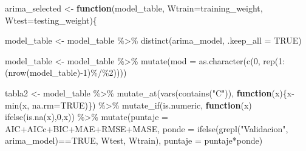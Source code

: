 \documentclass[
]{article}
\newenvironment{Shaded}{\begin{snugshade}}{\end{snugshade}}
\newcommand{\AttributeTok}[1]{\textcolor[rgb]{0.77,0.63,0.00}{#1}}
\newcommand{\ConstantTok}[1]{\textcolor[rgb]{0.00,0.00,0.00}{#1}}
\newcommand{\ControlFlowTok}[1]{\textcolor[rgb]{0.13,0.29,0.53}{\textbf{#1}}}
\newcommand{\DecValTok}[1]{\textcolor[rgb]{0.00,0.00,0.81}{#1}}
\newcommand{\FunctionTok}[1]{\textcolor[rgb]{0.00,0.00,0.00}{#1}}
\newcommand{\NormalTok}[1]{#1}
\newcommand{\OtherTok}[1]{\textcolor[rgb]{0.56,0.35,0.01}{#1}}
\newcommand{\SpecialCharTok}[1]{\textcolor[rgb]{0.00,0.00,0.00}{#1}}
\newcommand{\StringTok}[1]{\textcolor[rgb]{0.31,0.60,0.02}{#1}}
\begin{document}
\begin{Shaded}
\begin{Highlighting}[]
\NormalTok{    arima\_selected }\OtherTok{\textless{}{-}} \ControlFlowTok{function}\NormalTok{(model\_table, }
                               \AttributeTok{Wtrain=}\NormalTok{training\_weight, }
                               \AttributeTok{Wtest=}\NormalTok{testing\_weight)\{}
        

\NormalTok{        model\_table }\OtherTok{\textless{}{-}}\NormalTok{ model\_table }\SpecialCharTok{\%\textgreater{}\%}
            \FunctionTok{distinct}\NormalTok{(arima\_model, }\AttributeTok{.keep\_all =} \ConstantTok{TRUE}\NormalTok{)}
        

\NormalTok{        model\_table }\OtherTok{\textless{}{-}}\NormalTok{ model\_table }\SpecialCharTok{\%\textgreater{}\%} 
            \FunctionTok{mutate}\NormalTok{(}\AttributeTok{mod =} \FunctionTok{as.character}\NormalTok{(}\FunctionTok{c}\NormalTok{(}\DecValTok{0}\NormalTok{, }\FunctionTok{rep}\NormalTok{(}\DecValTok{1}\SpecialCharTok{:}\NormalTok{(}\FunctionTok{nrow}\NormalTok{(model\_table)}\SpecialCharTok{{-}}\DecValTok{1}\NormalTok{)}\SpecialCharTok{\%/\%}\DecValTok{2}\NormalTok{))))}
        

\NormalTok{        tabla2 }\OtherTok{\textless{}{-}}\NormalTok{ model\_table }\SpecialCharTok{\%\textgreater{}\%} 
            \FunctionTok{mutate\_at}\NormalTok{(}\FunctionTok{vars}\NormalTok{(}\FunctionTok{contains}\NormalTok{(}\StringTok{"C"}\NormalTok{)), }\ControlFlowTok{function}\NormalTok{(x)\{x}\SpecialCharTok{{-}}\FunctionTok{min}\NormalTok{(x, }\AttributeTok{na.rm=}\ConstantTok{TRUE}\NormalTok{)\}) }\SpecialCharTok{\%\textgreater{}\%} 
            \FunctionTok{mutate\_if}\NormalTok{(is.numeric, }\ControlFlowTok{function}\NormalTok{(x) }\FunctionTok{ifelse}\NormalTok{(}\FunctionTok{is.na}\NormalTok{(x),}\DecValTok{0}\NormalTok{,x)) }\SpecialCharTok{\%\textgreater{}\%} 
            \FunctionTok{mutate}\NormalTok{(}\AttributeTok{puntaje =}\NormalTok{ AIC}\SpecialCharTok{+}\NormalTok{AICc}\SpecialCharTok{+}\NormalTok{BIC}\SpecialCharTok{+}\NormalTok{MAE}\SpecialCharTok{+}\NormalTok{RMSE}\SpecialCharTok{+}\NormalTok{MASE,}
                   \AttributeTok{ponde =} \FunctionTok{ifelse}\NormalTok{(}\FunctionTok{grepl}\NormalTok{(}\StringTok{"Validacion"}\NormalTok{, }
\NormalTok{                                        arima\_model)}\SpecialCharTok{==}\ConstantTok{TRUE}\NormalTok{,}
\NormalTok{                                  Wtest, }
\NormalTok{                                  Wtrain),}
                   \AttributeTok{puntaje =}\NormalTok{ puntaje}\SpecialCharTok{*}\NormalTok{ponde)}
        


\end{Highlighting}
\end{Shaded}
\end{document}
